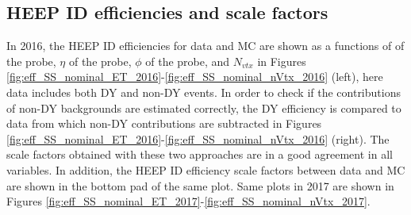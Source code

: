\subsection{HEEP ID efficiencies and scale factors}
\label{subsubsec:SF_results}
In 2016, the HEEP ID efficiencies for data and MC are shown as a functions of \et of the probe, $\eta$ of the probe, $\phi$ of the probe, and $N_{vtx}$ in Figures \ref{fig:eff_SS_nominal_ET_2016}-\ref{fig:eff_SS_nominal_nVtx_2016} (left), here data includes both DY and non-DY events. In order to check if the contributions of non-DY backgrounds are estimated correctly, the DY efficiency is compared to data from which non-DY contributions are subtracted in Figures \ref{fig:eff_SS_nominal_ET_2016}-\ref{fig:eff_SS_nominal_nVtx_2016} (right). The scale factors obtained with these two approaches are in a good agreement in all variables. In addition, the HEEP ID efficiency scale factors between data and MC are shown in the bottom pad of the same plot.
Same plots in 2017 are shown in Figures \ref{fig:eff_SS_nominal_ET_2017}-\ref{fig:eff_SS_nominal_nVtx_2017}.
